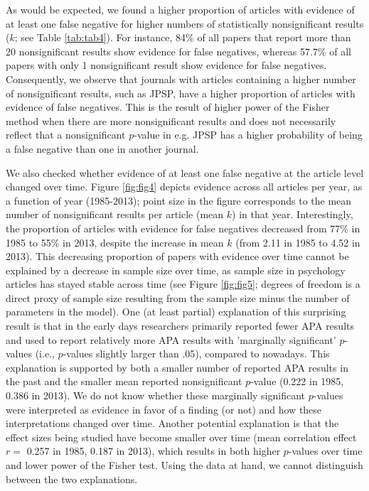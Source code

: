 \documentclass{article}
\begin{document}
As would be expected, we found a higher proportion of articles with evidence of at least one false negative for higher numbers of statistically nonsignificant results ($k$; see Table \ref{tab:tab4}). For instance, 84\% of all papers that report more than 20 nonsignificant results show evidence for false negatives, whereas 57.7\% of all papers with only 1 nonsignificant result show evidence for false negatives. Consequently, we observe that journals with articles containing a higher number of nonsignificant results, such as JPSP, have a higher proportion of articles with evidence of false negatives. This is the result of higher power of the Fisher method when there are more nonsignificant results and does not necessarily reflect that a nonsignificant $p$-value in e.g. JPSP has a higher probability of being a false negative than one in another journal.

We also checked whether evidence of at least one false negative at the article level changed over time. Figure \ref{fig:fig4} depicts evidence across all articles per year, as a function of year (1985-2013); point size in the figure corresponds to the mean number of nonsignificant results per article (mean $k$) in that year. Interestingly, the proportion of articles with evidence for false negatives decreased from 77\% in 1985 to 55\% in 2013, despite the increase in mean $k$ (from 2.11 in 1985 to 4.52 in 2013). This decreasing proportion of papers with evidence over time cannot be explained by a decrease in sample size over time, as sample size in psychology articles has stayed stable across time (see Figure \ref{fig:fig5}; degrees of freedom is a direct proxy of sample size resulting from the sample size minus the number of parameters in the model). One (at least partial) explanation of this surprising result is that in the early days researchers primarily reported fewer APA results and used to report relatively more APA results with 'marginally significant' $p$-values (i.e., $p$-values slightly larger than .05), compared to nowadays. This explanation is supported by both a smaller number of reported APA results in the past and the smaller mean reported nonsignificant $p$-value (0.222 in 1985, 0.386 in 2013). We do not know whether these marginally significant $p$-values were interpreted as evidence in favor of a finding (or not) and how these interpretations changed over time. Another potential explanation is that the effect sizes being studied have become smaller over time (mean correlation effect $r=$ 0.257 in 1985, 0.187 in 2013), which results in both higher $p$-values over time and lower power of the Fisher test. Using the data at hand, we cannot distinguish between the two explanations.
\end{document}
